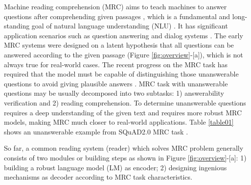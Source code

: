 \documentclass[letterpaper]{article} %
\begin{document}
Machine reading comprehension (MRC) aims to teach machines to answer questions after comprehending given passages \cite{hermann2015teaching,Joshi2017TriviaQA,Rajpurkar2018Know}, which is a fundamental and long-standing goal of natural language understanding (NLU) \cite{zhang2020mrc}. It has significant application scenarios %
such as question answering and dialog systems \cite{zhang2018modeling,choi2018quac,reddy2019coqa,zhang2018mrc,xu2020topic,zhu2018lingke}.
The early MRC systems \cite{kadlec2016text,Chen2016A,Dhingra2017Gated,Wang2017Gated,Seo2016Bidirectional} were designed on a latent hypothesis that all questions can be answered according to the given passage (Figure \ref{fig:overview}-[a]), which is not always true for real-world cases. %
The recent progress on the MRC task has required that the model must be capable of distinguishing those unanswerable questions to avoid giving plausible answers \cite{Rajpurkar2018Know}. MRC task with unanswerable questions may be usually decomposed into two subtasks: 1) answerability verification and 2) reading comprehension.
To determine unanswerable questions requires a deep understanding of the given text and requires more robust MRC models, making MRC much closer to real-world applications. Table \ref{table01} shows an unanswerable example from SQuAD2.0 MRC task \cite{Rajpurkar2018Know}. 






So far, a common reading system (reader) which solves MRC problem generally consists of two modules or building steps as shown in Figure \ref{fig:overview}-[a]:
1) building a robust language model (LM) as encoder; 2) designing ingenious mechanisms as decoder according to MRC task characteristics.
\end{document}
